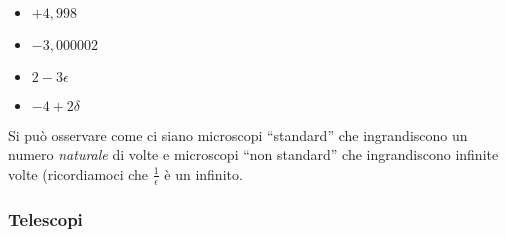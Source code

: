 \begin{esempio}
~

\begin{multicols}{4}
\begin{itemize}[nosep]
 \item \(+4,998\)
 \item \(-3,000002\)
 \item \(2-3\epsilon\)
 \item \(-4+2\delta\)
\end{itemize}
\end{multicols}

\begin{inaccessibleblock}
\begin{minipage}{.48\linewidth}
 \begin{center}
\scalebox{0.7}{\microscopioa}
 \end{center}
\end{minipage}
\hfill
\begin{minipage}{.48\linewidth}
 \begin{center}
\scalebox{0.7}{\microscopiob}
 \end{center}
\end{minipage}

\begin{minipage}{.48\linewidth}
 \begin{center}
\scalebox{0.7}{\microscopioc}
 \end{center}
\label{fig:microscopioc}
\end{minipage}
\hfill
\begin{minipage}{.48\linewidth}
 \begin{center}
\scalebox{0.7}{\microscopiod}
 \end{center}
\end{minipage}
\end{inaccessibleblock}
\end{esempio}
 
Si può osservare come ci siano microscopi ``standard'' che ingrandiscono un 
numero \emph{naturale} di volte e microscopi ``non standard'' che 
ingrandiscono infinite volte (ricordiamoci che \(\frac{1}{\epsilon}\) è un 
infinito.

\subsubsection{Telescopi}
\label{subsec:insnum_telescopi}

